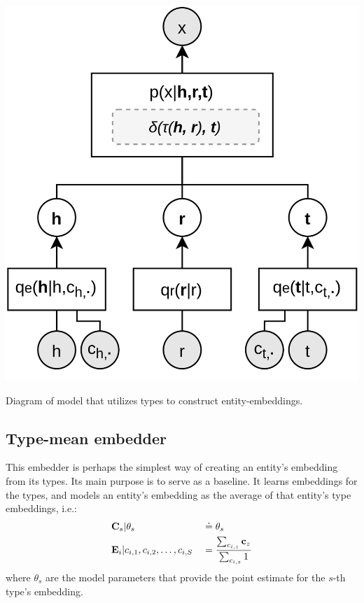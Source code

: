 \begin{marginfigure}
    \centering
    \includegraphics[width=\linewidth]{figures/type-embed.png}
    \caption[Model diagram with types for entity-embeddings.]{Diagram of model that utilizes types to construct entity-embeddings. }
    \label{fig:type_for_entity_embeddings}
\end{marginfigure}

\subsection{Type-mean embedder}\label{sec:methods:type_mean}
This embedder is perhaps the simplest way of creating an entity's embedding from its types. Its main purpose is to serve as a baseline. 
It learns embeddings for the types, and models an entity's embedding as the average of that entity's type embeddings, i.e.:
\begin{align}
    & \vec{C}_{s} | \theta_{s} && \simpnt \theta_{s} \\
%
    & \vec{E}_i | c_{i,1}, c_{i,2}, \dots, c_{i,S} && 
    = \frac{\sum_{c_{i,z}} \vec{c}_z}{\sum_{c_{i,z}} 1} 
\end{align}
where $\theta_{s}$ are the model parameters that provide the point estimate for the $s$-th type's embedding.

